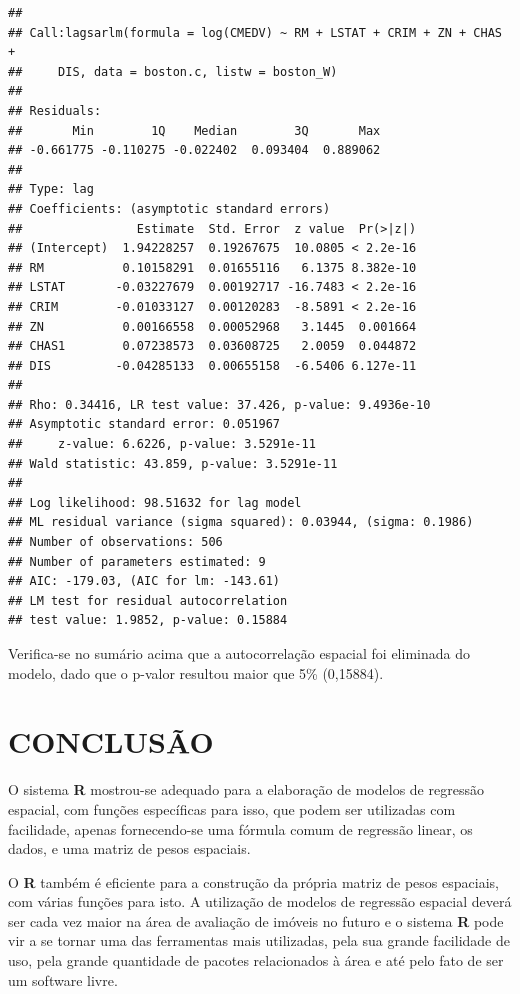 \documentclass[12pt,]{article}
\begin{document}
\begin{verbatim}
## 
## Call:lagsarlm(formula = log(CMEDV) ~ RM + LSTAT + CRIM + ZN + CHAS + 
##     DIS, data = boston.c, listw = boston_W)
## 
## Residuals:
##       Min        1Q    Median        3Q       Max 
## -0.661775 -0.110275 -0.022402  0.093404  0.889062 
## 
## Type: lag 
## Coefficients: (asymptotic standard errors) 
##                Estimate  Std. Error  z value  Pr(>|z|)
## (Intercept)  1.94228257  0.19267675  10.0805 < 2.2e-16
## RM           0.10158291  0.01655116   6.1375 8.382e-10
## LSTAT       -0.03227679  0.00192717 -16.7483 < 2.2e-16
## CRIM        -0.01033127  0.00120283  -8.5891 < 2.2e-16
## ZN           0.00166558  0.00052968   3.1445  0.001664
## CHAS1        0.07238573  0.03608725   2.0059  0.044872
## DIS         -0.04285133  0.00655158  -6.5406 6.127e-11
## 
## Rho: 0.34416, LR test value: 37.426, p-value: 9.4936e-10
## Asymptotic standard error: 0.051967
##     z-value: 6.6226, p-value: 3.5291e-11
## Wald statistic: 43.859, p-value: 3.5291e-11
## 
## Log likelihood: 98.51632 for lag model
## ML residual variance (sigma squared): 0.03944, (sigma: 0.1986)
## Number of observations: 506 
## Number of parameters estimated: 9 
## AIC: -179.03, (AIC for lm: -143.61)
## LM test for residual autocorrelation
## test value: 1.9852, p-value: 0.15884
\end{verbatim}

Verifica-se no sumário acima que a autocorrelação espacial foi eliminada
do modelo, dado que o p-valor resultou maior que 5\% (0,15884).

\section{CONCLUSÃO}\label{conclusao}

O sistema \textbf{R} mostrou-se adequado para a elaboração de modelos de
regressão espacial, com funções específicas para isso, que podem ser
utilizadas com facilidade, apenas fornecendo-se uma fórmula comum de
regressão linear, os dados, e uma matriz de pesos espaciais.

O \textbf{R} também é eficiente para a construção da própria matriz de
pesos espaciais, com várias funções para isto. A utilização de modelos
de regressão espacial deverá ser cada vez maior na área de avaliação de
imóveis no futuro e o sistema \textbf{R} pode vir a se tornar uma das
ferramentas mais utilizadas, pela sua grande facilidade de uso, pela
grande quantidade de pacotes relacionados à área e até pelo fato de ser
um software livre.
\end{document}
